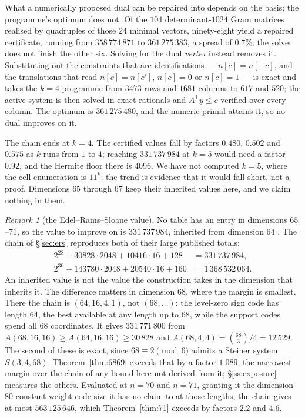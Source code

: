 \documentclass[11pt]{amsart}
\theoremstyle{remark}
\newtheorem{remark}[theorem]{Remark}
\begin{document}
What a numerically proposed dual can be repaired into depends on the basis; the
programme's optimum does not. Of the $104$ determinant-$1024$ Gram matrices
realised by quadruples of those $24$ minimal vectors, ninety-eight yield a repaired
certificate, running from $358\,774\,871$ to $361\,275\,383$, a spread of $0.7\%$;
the solver does not finish the other six. Solving for the dual \emph{vertex}
instead removes it. Substituting out the
constraints that are identifications --- $n[c]=n[-c]$, and the translations that
read $n[c]=n[c']$, $n[c]=0$ or $n[c]=1$ --- is exact and takes the $k=4$
programme from $3473$ rows and $1681$ columns to $617$ and $520$; the active
system is then solved in exact rationals and $A^{\mathsf T}y\le c$ verified over
every column. The optimum is
$361\,275\,480$, and the numeric primal attains it, so no dual improves on it.

The chain ends at $k=4$. The certified values fall by factors $0.480$, $0.502$
and $0.575$ as $k$ runs from $1$ to $4$; reaching $331\,737\,984$ at $k=5$ would
need a factor $0.92$, and the Hermite floor there is $4096$. We have not computed
$k=5$, where the cell enumeration is $11^k$; the trend is evidence that it would
fall short, not a proof. Dimensions $65$ through $67$ keep their inherited values
here, and we claim nothing in them.

\begin{remark}[the Edel--Rains--Sloane value]\label{rem:ers}
No table has an entry in dimensions $65$--$71$, so the value to improve on is
$331\,737\,984$, inherited from dimension $64$ \cite{edel-rains-sloane1998}. The
chain of \S\ref{sec:ers} reproduces both of their large published totals:
\begin{align*}
  2^{28}+30828\cdot2048+10416\cdot16+128 &= 331\,737\,984,\\
  2^{30}+143780\cdot2048+20540\cdot16+160 &= 1\,368\,532\,064.
\end{align*}
An inherited value is not the value the construction takes in the dimension that
inherits it. The difference matters in dimension $68$, where the margin is
smallest. There the chain is $(64,16,4,1)$, not $(68,\dots)$: the level-zero sign code
has length $64$, the best available at any length up to $68$, while the support codes
spend all $68$ coordinates. It gives $331\,771\,800$ from
$A(68,16,16)\ge A(64,16,16)\ge30\,828$ and
$A(68,4,4)=\binom{68}{3}/4=12\,529$. The second of these is exact, since
$68\equiv2\pmod6$ admits a Steiner system $S(3,4,68)$. Theorem~\ref{thm:6869}
exceeds that by a factor $1.089$, the narrowest margin over the chain of any bound
here not derived from it; \S\ref{ss:exposure} measures the others. Evaluated at $n=70$ and $n=71$, granting it the dimension-$80$
constant-weight code size it has no claim to at those lengths, the chain gives
at most $563\,125\,646$, which Theorem~\ref{thm:71} exceeds by factors $2.2$ and
$4.6$.
\end{remark}
\end{document}
